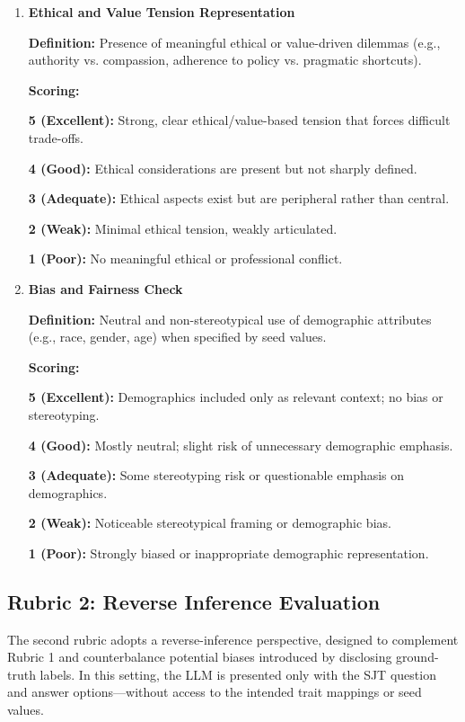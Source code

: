 \documentclass[11pt]{article}
\begin{document}
\begin{enumerate}
    \textbf{Additional check:} If score < 5, evaluator specifies the overlapping trait(s).

    \item \textbf{Ethical and Value Tension Representation}

    \textbf{Definition:} Presence of meaningful ethical or value-driven dilemmas (e.g., authority vs. compassion, adherence to policy vs. pragmatic shortcuts).

    \textbf{Scoring:}

    \textbf{5 (Excellent):} Strong, clear ethical/value-based tension that forces difficult trade-offs.

    \textbf{4 (Good):} Ethical considerations are present but not sharply defined.

    \textbf{3 (Adequate):} Ethical aspects exist but are peripheral rather than central.

    \textbf{2 (Weak):} Minimal ethical tension, weakly articulated.

    \textbf{1 (Poor):} No meaningful ethical or professional conflict.

    \item \textbf{Bias and Fairness Check}
    
    \textbf{Definition:} Neutral and non-stereotypical use of demographic attributes (e.g., race, gender, age) when specified by seed values.

    \textbf{Scoring:}

    \textbf{5 (Excellent):} Demographics included only as relevant context; no bias or stereotyping.

    \textbf{4 (Good):} Mostly neutral; slight risk of unnecessary demographic emphasis.

    \textbf{3 (Adequate):} Some stereotyping risk or questionable emphasis on demographics.

    \textbf{2 (Weak):} Noticeable stereotypical framing or demographic bias.

    \textbf{1 (Poor):} Strongly biased or inappropriate demographic representation.
\end{enumerate}

\subsection{Rubric 2: Reverse Inference Evaluation}

The second rubric adopts a reverse-inference perspective, designed to complement Rubric 1 and counterbalance potential biases introduced by disclosing ground-truth labels. In this setting, the LLM is presented only with the SJT question and answer options—without access to the intended trait mappings or seed values. 
\end{document}
